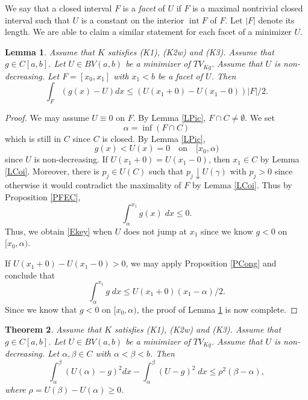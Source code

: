 \documentclass[11pt]{amsart} %
\numberwithin{equation}{section}
\newtheorem{thm}{Theorem}[section]
\newtheorem{lem}[thm]{Lemma}
\begin{document}
We say that a closed interval $F$ is a \emph{facet} of $U$ if $F$ is a maximal nontrivial closed interval such that $U$ is a constant on the interior $\operatorname{int}F$ of $F$.
 Let $|F|$ denote its length.
 We are able to claim a similar statement for each facet of a minimizer $U$.
\begin{lem} \label{LCGF}
Assume that $K$ satisfies (K1), (K2w) and (K3).
 Assume that $g\in C[a,b]$.
 Let $U\in BV(a,b)$ be a minimizer of $TV_{Kg}$.
 Assume that $U$ is non-decreasing.
 Let $F=[x_0,x_1]$ with $x_1<b$ be a facet of $U$.
 Then
\begin{equation} \label{Ekey}
	\int_F \left( g(x)-U \right) dx
	\leq \left( U(x_1+0) - U(x_1-0) \right)|F|/2.
\end{equation}
\end{lem}
\begin{proof}
We may assume $U\equiv0$ on $F$.
 By Lemma \ref{LPic}, $F\cap C\neq\emptyset$.
 We set
\[
	\alpha = \inf(F\cap C)
\]
which is still in $C$ since $C$ is closed.
 By Lemma \ref{LPic},
\[
	g(x) < U(x) = 0 \quad\text{on}\quad [x_0, \alpha)
\]
since $U$ is non-decreasing.
 If $U(x_1+0)=U(x_1-0)$, then $x_1\in C$ by Lemma \ref{LCoi}.
 Moreover, there is $p_j\in U(C)$ such that $p_j\downarrow U(\gamma)$ with $p_j>0$ since otherwise it would contradict the maximality of $F$ by Lemma \ref{LCoi}.
 Thus by Proposition \ref{PFEC},
\[
	\int_\alpha^{x_1} g(x)\; dx \leq 0.
\]
Thus, we obtain \eqref{Ekey} when $U$ does not jump at $x_1$ since we know $g<0$ on $[x_0,\alpha)$.

If $U(x_1+0)-U(x_1-0)>0$, we may apply Proposition \ref{PCong} and conclude that
\[
	\int_\alpha^{x_1} g\; dx
	\leq U(x_1+0)(x_1-\alpha)/2.
\]
Since we know that $g<0$ on $[x_0,\alpha)$, the proof of Lemma \ref{LCGF} is now complete.
\end{proof}
\begin{thm} \label{TFidInc}
Assume that $K$ satisfies (K1), (K2w) and (K3).
 Assume that $g\in C[a,b]$.
 Let $U\in BV(a,b)$ be a minimizer of $TV_{Kg}$.
 Assume that $U$ is non-decreasing.
 Let $\alpha,\beta\in C$ with $\alpha<\beta<b$.
 Then
\[
	\int_\alpha^\beta \left( U(\alpha) - g \right)^2 dx
	- \int_\alpha^\beta (U-g)^2\; dx
	\leq \rho^2 (\beta-\alpha), 
\]
where $\rho=U(\beta)-U(\alpha)\geq0$.
\end{thm}
\end{document}
